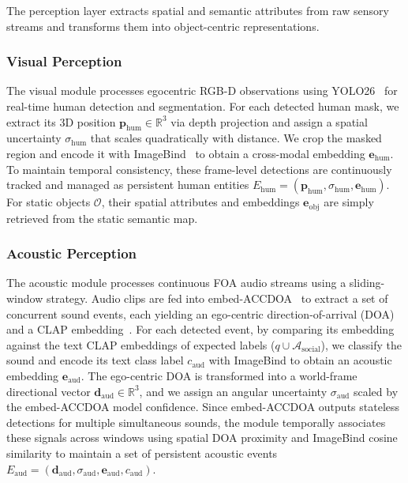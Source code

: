 The perception layer extracts spatial and semantic attributes from raw sensory streams and transforms them into object-centric representations.

\subsubsection{Visual Perception}
The visual module processes egocentric RGB-D observations using YOLO26~\cite{YOLO26KeyArchitectural2026} for real-time human detection and segmentation. For each detected human mask, we extract its 3D position $\mathbf{p}_{\mathrm{hum}} \in \mathbb{R}^3$ via depth projection and assign a spatial uncertainty $\sigma_{\mathrm{hum}}$ that scales quadratically with distance. We crop the masked region and encode it with ImageBind~\cite{ImageBindOneEmbedding2023} to obtain a cross-modal embedding $\mathbf{e}_{\mathrm{hum}}$. To maintain temporal consistency, these frame-level detections are continuously tracked and managed as persistent human entities $E_{\mathrm{hum}} = (\mathbf{p}_{\mathrm{hum}}, \sigma_{\mathrm{hum}}, \mathbf{e}_{\mathrm{hum}})$. For static objects $\mathcal{O}$, their spatial attributes and embeddings $\mathbf{e}_{\mathrm{obj}}$ are simply retrieved from the static semantic map.

\subsubsection{Acoustic Perception}
The acoustic module processes continuous FOA audio streams using a sliding-window strategy. Audio clips are fed into embed-ACCDOA~\cite{OpenvocabularySoundEvent2025} to extract a set of concurrent sound events, each yielding an ego-centric direction-of-arrival (DOA) and a CLAP embedding~\cite{CLAPLearningAudio2023}. For each detected event, by comparing its embedding against the text CLAP embeddings of expected labels ($q \cup \mathcal{A}_{\mathrm{social}}$), we classify the sound and encode its text class label $c_{\mathrm{aud}}$ with ImageBind to obtain an acoustic embedding $\mathbf{e}_{\mathrm{aud}}$. The ego-centric DOA is transformed into a world-frame directional vector $\mathbf{d}_{\mathrm{aud}} \in \mathbb{R}^3$, and we assign an angular uncertainty $\sigma_{\mathrm{aud}}$ scaled by the embed-ACCDOA model confidence. Since embed-ACCDOA outputs stateless detections for multiple simultaneous sounds, the module temporally associates these signals across windows using spatial DOA proximity and ImageBind cosine similarity to maintain a set of persistent acoustic events $E_{\mathrm{aud}} = (\mathbf{d}_{\mathrm{aud}}, \sigma_{\mathrm{aud}}, \mathbf{e}_{\mathrm{aud}}, c_{\mathrm{aud}})$.

